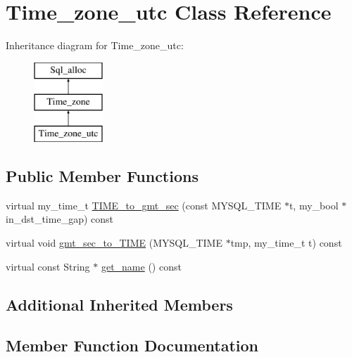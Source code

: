 \hypertarget{classTime__zone__utc}{}\section{Time\+\_\+zone\+\_\+utc Class Reference}
\label{classTime__zone__utc}
Inheritance diagram for Time\+\_\+zone\+\_\+utc\+:\begin{figure}[H]
\begin{center}
\leavevmode
\includegraphics[height=3.000000cm]{classTime__zone__utc}
\end{center}
\end{figure}
\subsection*{Public Member Functions}
\begin{DoxyCompactItemize}
\item 
virtual my\+\_\+time\+\_\+t \mbox{\hyperlink{classTime__zone__utc_afe855f8afb56db1da43edd51b2340ad6}{T\+I\+M\+E\+\_\+to\+\_\+gmt\+\_\+sec}} (const M\+Y\+S\+Q\+L\+\_\+\+T\+I\+ME $\ast$t, my\+\_\+bool $\ast$in\+\_\+dst\+\_\+time\+\_\+gap) const
\item 
virtual void \mbox{\hyperlink{classTime__zone__utc_a7232c037e186e31d60dc46fda88541a9}{gmt\+\_\+sec\+\_\+to\+\_\+\+T\+I\+ME}} (M\+Y\+S\+Q\+L\+\_\+\+T\+I\+ME $\ast$tmp, my\+\_\+time\+\_\+t t) const
\item 
virtual const String $\ast$ \mbox{\hyperlink{classTime__zone__utc_ae9e3ff6abe408adbb9005540ffee605c}{get\+\_\+name}} () const
\end{DoxyCompactItemize}
\subsection*{Additional Inherited Members}


\subsection{Member Function Documentation}
\mbox{\label{classTime__zone__utc_ae9e3ff6abe408adbb9005540ffee605c}} 
